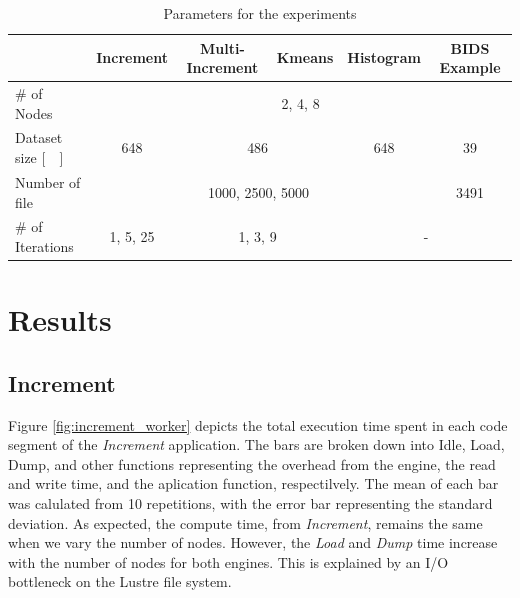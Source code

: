 \documentclass[conference]{IEEEtran}
\begin{document}
\begin{table}[t]
	\renewcommand{\arraystretch}{1.5}
	\caption{Parameters for the experiments}\label{table:parameters}
	\centering
	\begin{tabular}{|l|c|c|c|c|c|}
		\hline & Increment & Multi-Increment & Kmeans & Histogram & BIDS Example \\\hline
		\# of Nodes & \multicolumn{5}{c|}{2, 4, 8} \\\hline
		Dataset size [\SI{}{\giga\byte}] & 648 &\multicolumn{2}{c|}{486} & 648 & \multicolumn{1}{c|}{39} \\\hline
		Number of file & \multicolumn{4}{c|}{1000, 2500, 5000}  & \multicolumn{1}{c|}{3491} \\\hline
		\# of Iterations & 1, 5, 25 & \multicolumn{2}{c|}{1, 3, 9}                 & \multicolumn{2}{c|}{-} \\\hline
	\end{tabular}
\end{table}

\section{Results}
\subsection{Increment}
Figure \ref{fig:increment_worker} depicts the total execution time spent in each code segment of the \textit{Increment} application.
The bars are broken down into Idle, Load, Dump, and other functions representing the overhead from the engine, the read and write time, and the aplication function, respectilvely.
The mean of each bar was calulated from 10 repetitions, with the error bar representing the standard deviation.
As expected, the compute time, from \textit{Increment}, remains the same when we vary the number of nodes.
However, the \textit{Load} and \textit{Dump} time increase with the number of nodes for both engines.
This is explained by an I/O bottleneck on the Lustre file system.
\end{document}
